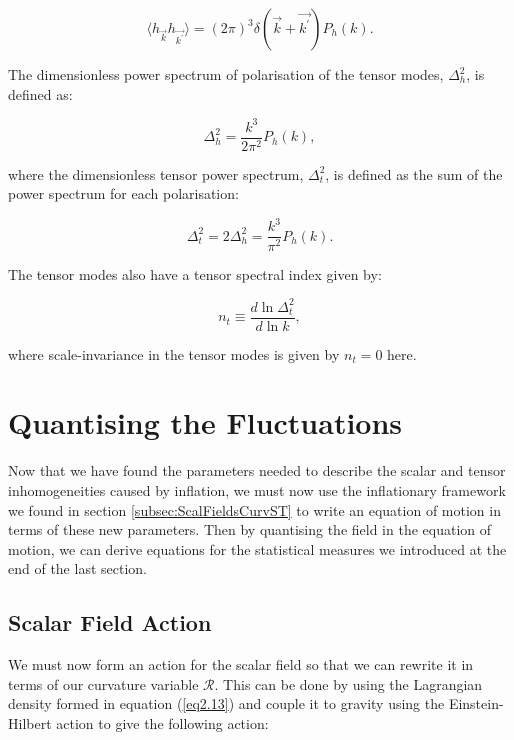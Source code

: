 \documentclass[a4paper,12pt,twoside]{report}
\begin{document}
\begin{equation} \label{eq2.54}
\langle h_{\vec{k}} h_{\vec{k^{\prime}}} \rangle = (2 \pi)^{3} \delta(\vec{k} + \vec{k^{\prime}}) P_{h}(k).
\end{equation}

The dimensionless power spectrum of polarisation of the tensor modes, $\Delta^{2}_{h}$, is defined as:

\begin{equation} \label{eq2.55}
\Delta^{2}_{h} = \frac{k^{3}}{2 \pi^{2}} P_{h}(k),
\end{equation}

where the dimensionless tensor power spectrum, $\Delta^{2}_{t}$, is defined as the sum of the power spectrum for each polarisation:

\begin{equation} \label{eq2.56}
\Delta^{2}_{t} = 2 \Delta^{2}_{h} = \frac{k^{3}}{\pi^{2}} P_{h}(k).
\end{equation}

The tensor modes also have a tensor spectral index given by:

\begin{equation} \label{eq2.57}
n_{t} \equiv \frac{d\ln \Delta^{2}_{t}}{d\ln k},
\end{equation}

where scale-invariance in the tensor modes is given by $n_{t} = 0$ here.

\section{Quantising the Fluctuations} \label{sec:QuanFluc}

Now that we have found the parameters needed to describe the scalar and tensor inhomogeneities caused by inflation, we must now use the inflationary framework we found in section \ref{subsec:ScalFieldsCurvST} to write an equation of motion in terms of these new parameters. Then by quantising the field in the equation of motion, we can derive equations for the statistical measures we introduced at the end of the last section.

\subsection{Scalar Field Action} \label{subsec:ScalFieldAct}

We must now form an action for the scalar field so that we can rewrite it in terms of our curvature variable $\mathcal{R}$. This can be done by using the Lagrangian density formed in equation (\ref{eq2.13}) and couple it to gravity using the Einstein-Hilbert action \cite{hilbert1915grundlagen} to give the following action:
\end{document}
